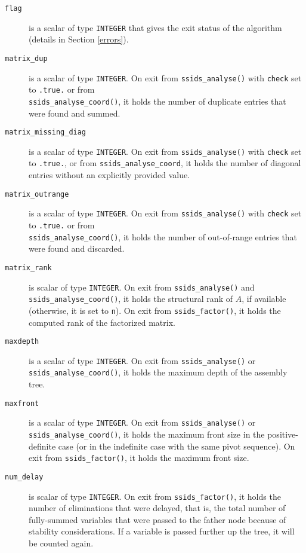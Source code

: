 \documentclass{spral}
\begin{document}
\begin{description}

\item[\texttt{flag}] is a scalar of type  {\tt INTEGER}
that gives the exit status of the algorithm (details in Section \ref{errors}).

\item[\texttt{matrix\_dup}] is a scalar  of type  {\tt INTEGER}.
On exit from {\tt ssids\_analyse()}
with {\tt check} set to {\tt .true.} or from \\
{\tt ssids\_analyse\_coord()}, it holds the
number of duplicate entries that were found and summed.

\item[\texttt{matrix\_missing\_diag}] is a scalar of type {\tt INTEGER}.
On exit from {\tt ssids\_analyse()} with {\tt check} set to {\tt .true.},
or from {\tt ssids\_analyse\_coord}, it holds the number of diagonal
entries without an explicitly provided value.

\item[\texttt{matrix\_outrange}] is a scalar  of type  {\tt INTEGER}.
On exit from {\tt ssids\_analyse()}
with {\tt check} set to {\tt .true.} or from \\
{\tt ssids\_analyse\_coord()}, it holds the
number of out-of-range entries that were   found and discarded.

\item[\texttt{matrix\_rank}] is scalar of type  {\tt INTEGER}. On exit from
{\tt ssids\_analyse()} and {\tt ssids\_analyse\_coord()}, it holds
the structural rank of $A$, if available (otherwise, it is set to {\tt n}).
On exit from
{\tt ssids\_factor()}, it holds the computed rank of
the factorized matrix.

\item[\texttt{maxdepth}] is a scalar of type  {\tt INTEGER}. On exit from
{\tt ssids\_analyse()} or {\tt ssids\_analyse\_coord()}, it holds the maximum depth of the assembly tree.

\item[\texttt{maxfront}] is a scalar of type  {\tt INTEGER}. On exit from
{\tt ssids\_analyse()} or {\tt ssids\_analyse\_coord()}, it holds the maximum front size
in the positive-definite case (or in the indefinite case with
the same pivot sequence). On exit from
{\tt ssids\_factor()}, it holds the maximum front size.

\item[\texttt{num\_delay}] is scalar of type  {\tt INTEGER}. On exit from
{\tt ssids\_factor()}, it holds the
number of eliminations that were
delayed, that is, the total number of fully-summed
variables that were passed to the father node because
of stability considerations. If a variable is passed
further up the tree, it will be counted again.


\end{description}
\end{document}
